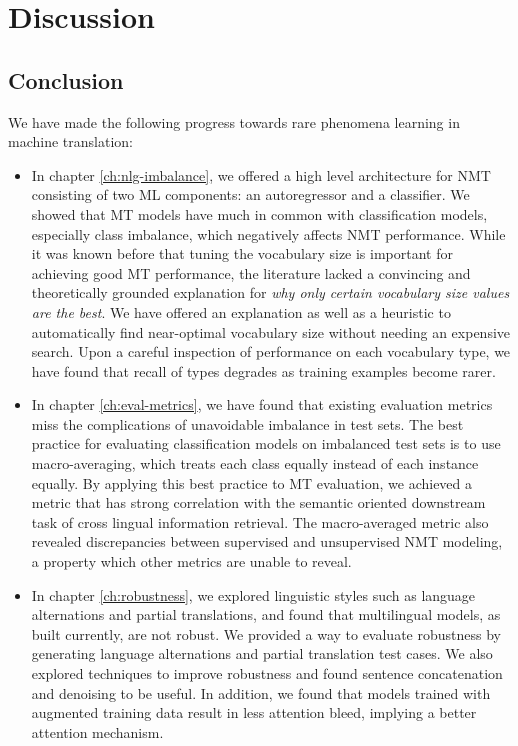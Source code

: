 \chapter{Discussion}
\label{ch:discussion}


\section{Conclusion}
We have made the following progress towards rare phenomena learning in machine translation:
\begin{itemize}
 \item In chapter \ref{ch:nlg-imbalance}, we offered a high level architecture for NMT consisting of two ML components: an autoregressor and a classifier.
  We showed that MT models have much in common with classification models, especially class imbalance, which negatively affects NMT performance.
 While it was known before that tuning the vocabulary size is important for achieving good MT performance, the literature lacked a convincing and theoretically grounded explanation for \textit{why only certain vocabulary size values are the best}.
 We have offered an explanation as well as a heuristic to automatically find near-optimal vocabulary size without needing an expensive search.
Upon a careful inspection of performance on each vocabulary type, we have found that recall of types degrades as training examples become rarer.
 
\item In chapter \ref{ch:eval-metrics}, we have found that existing evaluation metrics miss the complications of unavoidable imbalance in test sets. 
 The best practice for evaluating classification models on imbalanced test sets is to use macro-averaging, which treats each class equally instead of each instance equally. 
 By applying this best practice to MT evaluation, we achieved a metric that has strong correlation with the semantic oriented downstream task of cross lingual information retrieval.
The macro-averaged metric also revealed discrepancies between supervised and unsupervised NMT modeling, a property which other metrics are unable to reveal.  

\item In chapter \ref{ch:robustness}, we explored linguistic styles such as language alternations and partial translations, and found that multilingual models, as built currently, are not robust. 
 We provided a way to evaluate robustness by generating language alternations and partial translation test cases.
 We also explored techniques to improve robustness and found sentence concatenation and denoising to be useful. In addition, we found that models trained with augmented training data result in less attention bleed, implying a better attention mechanism.
 

\end{itemize}

